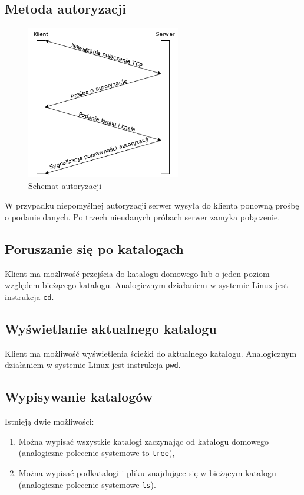 \documentclass[10pt,a4paper]{article}
\begin{document}
\pagebreak
\subsection{Metoda autoryzacji}
\begin{figure}[ht]
\centering
\includegraphics[width=0.6\textwidth]{img/auth.png}
\caption{\label{fig:auth.png}Schemat autoryzacji}
\end{figure}
\FloatBarrier
W przypadku niepomyślnej autoryzacji serwer wysyła do klienta ponowną prośbę o podanie danych. Po trzech nieudanych próbach serwer zamyka połączenie.

\subsection{Poruszanie się po katalogach}
Klient ma możliwość przejścia do katalogu domowego lub o jeden poziom względem bieżącego katalogu. Analogicznym działaniem w systemie Linux jest instrukcja \texttt{cd}.

\subsection{Wyświetlanie aktualnego katalogu}
Klient ma możliwość wyświetlenia ścieżki do aktualnego katalogu. Analogicznym działaniem w systemie Linux jest instrukcja \texttt{pwd}.

\subsection{Wypisywanie katalogów}
\noindent Istnieją dwie możliwości:
\begin{enumerate}
    \item Można wypisać wszystkie katalogi zaczynając od katalogu domowego (analogiczne polecenie systemowe to \texttt{tree}),
    \item Można wypisać podkatalogi i pliku znajdujące się w bieżącym katalogu (analogiczne polecenie systemowe \texttt{ls}).
\end{enumerate}
\end{document}
